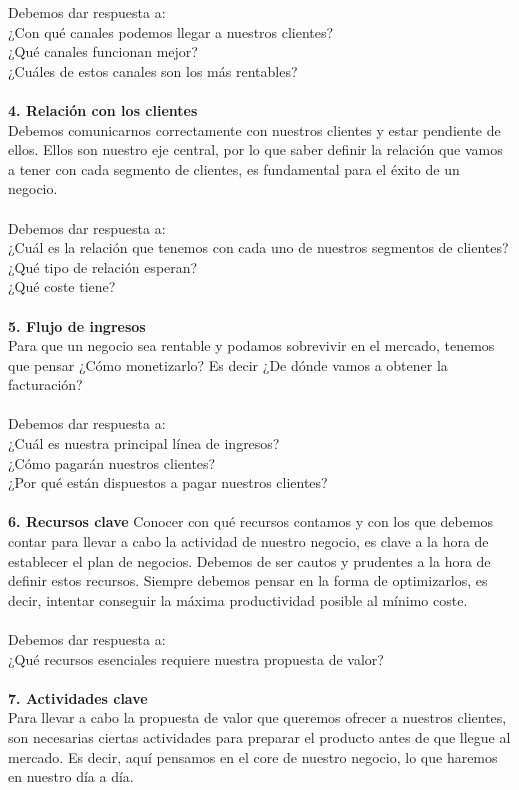{Debemos dar respuesta a:\\
¿Con qué canales podemos llegar a nuestros clientes?\\
¿Qué canales funcionan mejor?\\
¿Cuáles de estos canales son los más rentables?\\\\
\textbf{4. Relación con los clientes}\\
Debemos comunicarnos correctamente con nuestros clientes y estar pendiente de ellos. Ellos son nuestro eje central, por lo que saber definir la relación que vamos a tener con cada segmento de clientes, es fundamental para el éxito de un negocio.\\\\
Debemos dar respuesta a:\\
¿Cuál es la relación que tenemos con cada uno de nuestros segmentos de clientes?\\
¿Qué tipo de relación esperan?\\
¿Qué coste tiene?\\\\
\textbf{5. Flujo de ingresos}\\
Para que un negocio sea rentable y podamos sobrevivir en el mercado, tenemos que pensar ¿Cómo monetizarlo? Es decir ¿De dónde vamos a obtener la facturación?\\\\
Debemos dar respuesta a:\\
¿Cuál es nuestra principal línea de ingresos? \\
¿Cómo pagarán nuestros clientes?\\
¿Por qué están dispuestos a pagar nuestros clientes?\\\\
\textbf{6. Recursos clave}
Conocer con qué recursos contamos y con los que debemos contar para llevar a cabo la actividad de nuestro negocio, es clave a la hora de establecer el plan de negocios. Debemos de ser cautos y prudentes a la hora de definir estos recursos. Siempre debemos pensar en la forma de optimizarlos, es decir, intentar conseguir la máxima productividad posible al mínimo coste.\\\\
Debemos dar respuesta a:\\
¿Qué recursos esenciales requiere nuestra propuesta de valor?\\\\
\textbf{7. Actividades clave}\\
Para llevar a cabo la propuesta de valor que queremos ofrecer a nuestros clientes, son necesarias ciertas actividades para preparar el producto antes de que llegue al mercado. Es decir, aquí pensamos en el core de nuestro negocio, lo que haremos en nuestro día a día.\\\\
}
